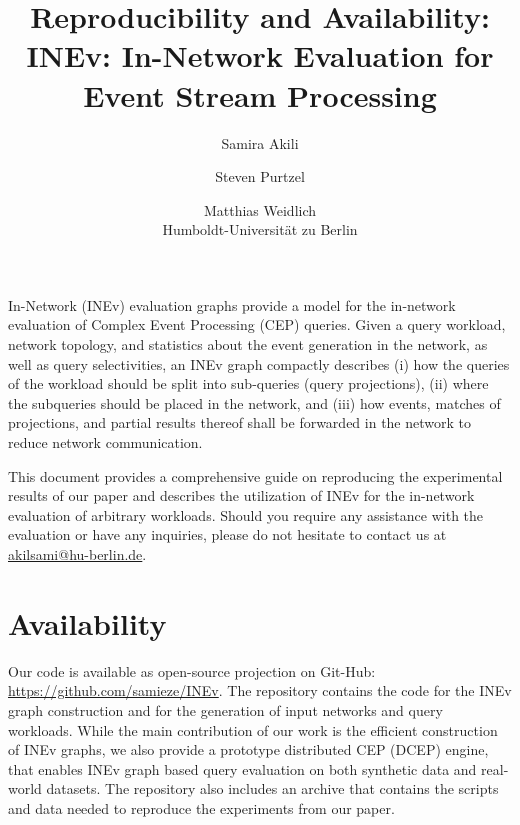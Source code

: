 \documentclass{article}
\title{Reproducibility and Availability:\\ INEv: In-Network Evaluation for Event Stream Processing}
\author{Samira Akili \and 
	Steven Purtzel \and
	Matthias Weidlich \\
	Humboldt-Universität zu Berlin
	}
\date{} %
\begin{document}
\maketitle
In-Network (INEv) evaluation graphs provide a model for the in-network evaluation of Complex Event Processing (CEP) queries. Given a query workload, network topology, and statistics about the event generation in the network, as well as query selectivities, an INEv graph compactly describes (i) how the queries of the workload should be split into sub-queries (query projections), (ii) where the subqueries should be placed in the network, and (iii) how events, matches of projections, and partial results thereof shall be forwarded in the network to reduce network communication.

This document provides a comprehensive guide on reproducing the experimental results of our paper and describes the utilization of INEv for the in-network evaluation of arbitrary workloads. Should you require any assistance with the evaluation or have any inquiries, please do not hesitate to contact us at \url{akilsami@hu-berlin.de}.

\section{Availability}


Our code is available as open-source projection on Git-Hub: \url{https://github.com/samieze/INEv}.
The repository contains the code for the INEv graph construction and for the generation of input networks and query workloads. 
While the main contribution of our work is the efficient construction of INEv graphs, we also provide a prototype distributed CEP (DCEP) engine, that enables INEv graph based query evaluation on both synthetic data and real-world datasets. 
The repository also includes an archive that contains the scripts and data needed to reproduce the experiments from our paper.
\end{document}
